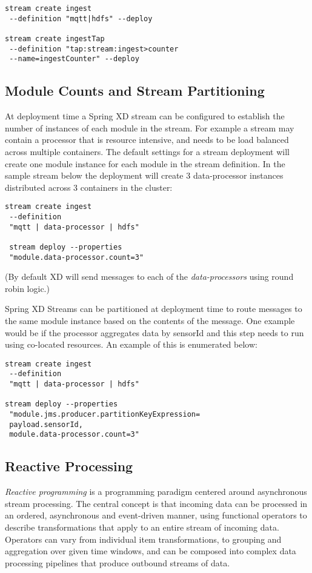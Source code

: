 \begin{lstlisting}
stream create ingest
 --definition "mqtt|hdfs" --deploy

stream create ingestTap
 --definition "tap:stream:ingest>counter
 --name=ingestCounter" --deploy
\end{lstlisting}

\subsection {Module Counts and Stream Partitioning}
At deployment time a Spring XD stream can be configured to establish the number
of instances of each module in the stream. For example a stream may contain
a processor that is resource intensive, and needs to be
load balanced across multiple containers. The default
settings for a stream deployment will create one module instance for each
module in the stream definition. In the sample stream below the
deployment will create 3 data-processor instances distributed
across 3 containers in the cluster:

\begin{lstlisting}
stream create ingest
 --definition
 "mqtt | data-processor | hdfs"

 stream deploy --properties
 "module.data-processor.count=3"
\end{lstlisting}

(By default XD will send messages to each of the \emph{data-processors}
using round robin logic.)

Spring XD Streams can be partitioned at deployment time to route messages to the
same module instance based on the contents of the message. One example
would be if the processor aggregates data by sensorId and this step needs to
run using co-located resources.  An example of this is enumerated below:

\begin{lstlisting}
stream create ingest
 --definition
 "mqtt | data-processor | hdfs"

stream deploy --properties
 "module.jms.producer.partitionKeyExpression=
 payload.sensorId,
 module.data-processor.count=3"
\end{lstlisting}

\subsection {Reactive Processing}


\emph{Reactive programming} is a programming paradigm centered around asynchronous
stream processing. The central concept is that incoming data can be processed in an
ordered, asynchronous and event-driven manner, using functional operators to describe
transformations that apply to an entire stream of incoming data. Operators can
vary from individual item transformations, to grouping and aggregation over given
time windows, and can be composed into complex data processing pipelines that produce
outbound streams of data.


